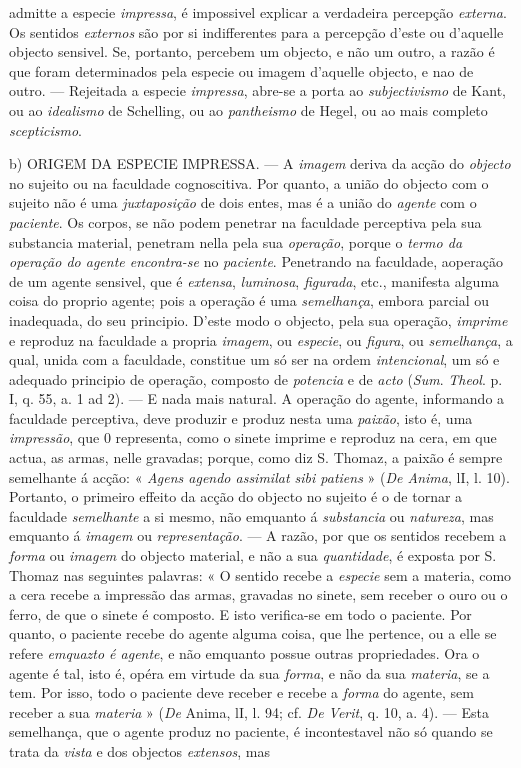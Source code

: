 admitte a especie \emph{impressa}, é impossivel explicar a verdadeira percepção \emph{externa}. Os sentidos \emph{externos} são por si indifferentes para a percepção d'este ou d'aquelle objecto sensivel. Se, portanto, percebem um objecto, e não um outro, a razão é que foram determinados pela especie ou imagem d'aquelle objecto, e nao de outro. --- Rejeitada a especie \emph{impressa}, abre-se a porta ao \emph{subjectivismo} de Kant, ou ao \emph{idealismo} de Schelling, ou ao \emph{pantheismo} de Hegel, ou ao mais completo \emph{scepticismo}.\par b) \textsc{ORIGEM} DA ESPECIE IMPRESSA. --- A \emph{imagem} deriva da acção do \emph{objecto} no sujeito ou na faculdade cognoscitiva. Por quanto, a união do objecto com o sujeito não é uma \emph{juxtaposição} de dois entes, mas é a união do \emph{agente} com o \emph{paciente}. Os corpos, se não podem penetrar na faculdade perceptiva pela sua substancia material, penetram nella pela sua \emph{operação}, porque o \emph{termo da operação do agente encontra-se} no \emph{paciente}. Penetrando na faculdade, aoperação de um agente sensivel, que é \emph{extensa}, \emph{luminosa}, \emph{figurada}, etc., manifesta alguma coisa do proprio agente; pois a operação é uma \emph{semelhança}, embora parcial ou inadequada, do seu principio. D'este modo o objecto, pela sua operação, \emph{imprime} e reproduz na faculdade a propria \emph{imagem}, ou \emph{especie}, ou \emph{figura}, ou \emph{semelhança}, a qual, unida com a faculdade, constitue um só ser na ordem \emph{intencional}, um só e adequado principio de operação, composto de \emph{potencia} e de \emph{acto} (\emph{Sum}. \emph{Theol}. p. I, q. 55, a. 1 ad 2). --- E nada mais natural. A operação do agente, informando a faculdade perceptiva, deve produzir e produz nesta uma \emph{paixão}, isto é, uma \emph{impressão}, que 0 representa, como o sinete imprime e reproduz na cera, em que actua, as armas, nelle gravadas; porque, como diz S. Thomaz, a paixão é sempre semelhante á acção: « \emph{Agens agendo assimilat sibi patiens} » (\emph{De Anima}, lI, l. 10). Portanto, o primeiro effeito da acção do objecto no sujeito é o de tornar a faculdade \emph{semelhante} a si mesmo, não emquanto á \emph{substancia} ou \emph{natureza}, mas emquanto á \emph{imagem} ou \emph{representação}. --- A razão, por que os sentidos recebem a \emph{forma} ou \emph{imagem} do objecto material, e não a sua \emph{quantidade}, é exposta por S. Thomaz nas seguintes palavras: « O sentido recebe a \emph{especie} sem a materia, como a cera recebe a impressão das armas, gravadas no sinete, sem receber o ouro ou o ferro, de que o sinete é composto. E isto verifica-se em todo o paciente. Por quanto, o paciente recebe do agente alguma coisa, que lhe pertence, ou a elle se refere \emph{emquazto é agente}, e não emquanto possue outras propriedades. Ora o agente é tal, isto é, opéra em virtude da sua \emph{forma}, e não da sua \emph{materia}, se a tem. Por isso, todo o paciente deve receber e recebe a \emph{forma} do agente, sem receber a sua \emph{materia} » (\emph{De} Anima, lI, l. 94; cf. \emph{De Verit}, q. 10, a. 4). --- Esta semelhança, que o agente produz no paciente, é incontestavel não só quando se trata da \emph{vista} e dos objectos \emph{extensos}, mas 